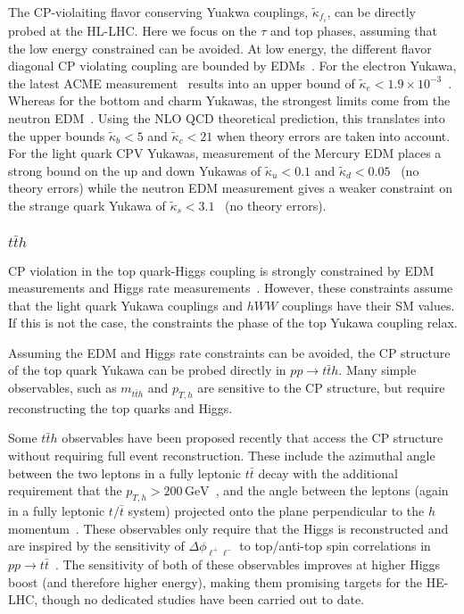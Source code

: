\documentclass[../report.tex]{subfiles}
\begin{document}
The CP-violaiting flavor conserving Yuakwa couplings, $\tilde \kappa_{f_i}$, can be directly probed at the HL-LHC. Here we focus on the $\tau$ and top phases, assuming that the low energy constrained can be avoided. 
At low energy, the different flavor diagonal CP violating coupling are bounded by EDMs~\cite{Brod:2013cka,Chien:2015xha,Altmannshofer:2015qra,Brod:2018pli}. 
For the electron Yukawa, the latest ACME measurement~\cite{Baron:2013eja,Andreev:2018ayy} results into an upper bound of $\tilde\kappa_e<1.9\times 10^{-3}$~\cite{Altmannshofer:2015qra}. Whereas for the bottom and charm Yukawas, the strongest limits come from the neutron EDM~\cite{Brod:2018pli}. Using the NLO QCD theoretical prediction, this translates into the upper bounds $\tilde\kappa_b<5$ and $\tilde\kappa_c<21$ when theory errors are taken into account.
For the light quark CPV Yukawas, measurement of the Mercury EDM places a strong bound on the up and down Yukawas of $\tilde\kappa_u<0.1$ and $\tilde\kappa_d<0.05$~\cite{Brod:2018xyz} (no theory errors) while the neutron EDM measurement gives a weaker constraint on the strange quark Yukawa of $\tilde\kappa_s<3.1$~\cite{Brod:2018xyz} (no theory errors).






\subsubsection{$t\bar{t} h$}

CP violation in the top quark-Higgs coupling is strongly constrained by EDM measurements and Higgs rate measurements~\cite{Brod:2013cka}. However, these constraints assume that the light quark Yukawa couplings and $hWW$ couplings have their SM values. If this is not the case, the constraints the phase of the top Yukawa coupling relax.
    
Assuming the EDM and Higgs rate  constraints can be avoided, the CP structure of the top quark Yukawa can be probed directly in $pp \to t\bar t h$. Many simple observables, such as $m_{t\bar t h}$ and $p_{T,h}$ are sensitive to the CP structure, but require reconstructing the top quarks and Higgs.

Some $t\bar t h$ observables have been proposed recently that access the CP structure without requiring full event reconstruction. These include the azimuthal angle between the two leptons in a fully leptonic $t\bar{t}$ decay with the additional requirement that the $p_{T,h} > 200\, \text{GeV}$~\cite{Buckley:2015vsa}, and the angle between the leptons (again in a fully leptonic $t/\bar t$ system) projected onto the plane perpendicular to the $h$ momentum~\cite{Boudjema:2015nda}. These observables only require that the Higgs is reconstructed and are inspired by the sensitivity of $\Delta \phi_{\ell^+\ell^-}$ to top/anti-top spin correlations in $pp \to t\bar t$~\cite{Mahlon:1995zn}. The sensitivity of both of these observables improves at higher Higgs boost (and therefore higher energy), making them promising targets for the HE-LHC, though no dedicated studies have been carried out to date.
\end{document}

